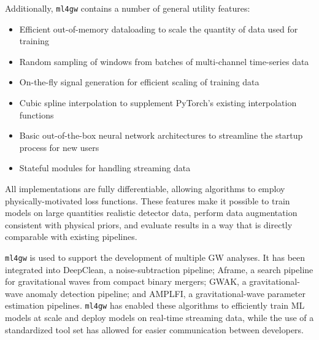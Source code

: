 \begin{refsection}
Additionally, \texttt{ml4gw} contains a number of general utility features:

\begin{itemize}
    \item Efficient out-of-memory dataloading to scale the quantity of data used for training
    \item Random sampling of windows from batches of multi-channel time-series data
    \item On-the-fly signal generation for efficient scaling of training data
    \item Cubic spline interpolation to supplement PyTorch's existing interpolation functions
    \item Basic out-of-the-box neural network architectures to streamline the startup process for new users
    \item Stateful modules for handling streaming data
\end{itemize}

All implementations are fully differentiable, allowing algorithms to employ physically-motivated loss functions.
These features make it possible to train models on large quantities realistic detector data, perform data augmentation consistent with physical priors, and evaluate results in a way that is directly comparable with existing pipelines.

\texttt{ml4gw} is used to support the development of multiple GW analyses. 
It has been integrated into DeepClean\cite{deepclean}, a noise-subtraction pipeline; Aframe\cite{aframe-methods}, a search pipeline for gravitational waves from compact binary mergers; GWAK\cite{Raikman:2023ktu}, a gravitational-wave anomaly detection pipeline; and AMPLFI\cite{amplfi}, a gravitational-wave parameter estimation pipelines.
\texttt{ml4gw} has enabled these algorithms to efficiently train ML models at scale and deploy models on real-time streaming data, while the use of a standardized tool set has allowed for easier communication between developers.

\singlespacing
\printbibliography[title=References,heading=subbibintoc]
\end{refsection}